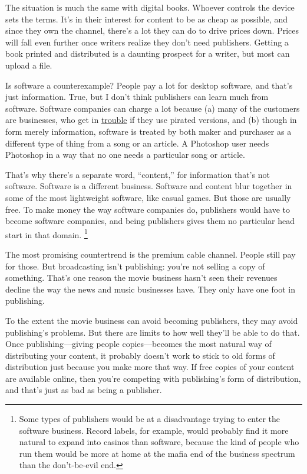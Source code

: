 \documentclass[12pt]{book}
\begin{document}
The situation is much the same with digital books. Whoever controls the
device sets the terms. It's in their interest for content to be as cheap
as possible, and since they own the channel, there's a lot they can do
to drive prices down. Prices will fall even further once writers realize
they don't need publishers. Getting a book printed and distributed is a
daunting prospect for a writer, but most can upload a file.

Is software a counterexample? People pay a lot for desktop software, and
that's just information. True, but I don't think publishers can learn
much from software. Software companies can charge a lot because (a) many
of the customers are businesses, who get in
\href{http://www.bsa.org/country/News\%20and\%20Events/News\%20Archives/en/2009/en-08312009-mueller.aspx?sc_lang=en}{trouble}
if they use pirated versions, and (b) though in form merely information,
software is treated by both maker and purchaser as a different type of
thing from a song or an article. A Photoshop user needs Photoshop in a
way that no one needs a particular song or article.

That's why there's a separate word, ``content,'' for information that's
not software. Software is a different business. Software and content
blur together in some of the most lightweight software, like casual
games. But those are usually free. To make money the way software
companies do, publishers would have to become software companies, and
being publishers gives them no particular head start in that domain.
\footnote{Some types of publishers would be at a disadvantage trying to
enter the software business. Record labels, for example, would probably
find it more natural to expand into casinos than software, because the
kind of people who run them would be more at home at the mafia end of
the business spectrum than the don't-be-evil end.}

The most promising countertrend is the premium cable channel. People
still pay for those. But broadcasting isn't publishing: you're not
selling a copy of something. That's one reason the movie business hasn't
seen their revenues decline the way the news and music businesses have.
They only have one foot in publishing.

To the extent the movie business can avoid becoming publishers, they may
avoid publishing's problems. But there are limits to how well they'll be
able to do that. Once publishing---giving people copies---becomes the
most natural way of distributing your content, it probably doesn't work
to stick to old forms of distribution just because you make more that
way. If free copies of your content are available online, then you're
competing with publishing's form of distribution, and that's just as bad
as being a publisher.
\end{document}
